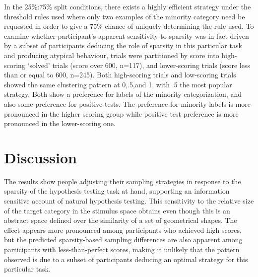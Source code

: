 \documentclass[10pt,letterpaper]{article}
\begin{document}
In the 25\%:75\% split conditions, there exists a highly efficient strategy under the threshold rules used where only two examples of the minority category need be requested in order to give a 75\% chance of uniquely determining the rule used. To examine whether participant's apparent sensitivity to sparsity was in fact driven by a subset of participants deducing the role of sparsity in this particular task and producing atypical behaviour, trials were partitioned by score into high-scoring `solved' trials (score over 600, n=117), and lower-scoring trials (score less than or equal to 600, n=245). Both high-scoring trials and low-scoring trials showed the same clustering pattern at 0,.5,and 1, with .5 the most popular strategy. Both show a preference for labels of the minority categorization, and also some preference for positive tests. The preference for minority labels is more pronounced in the higher scoring group while positive test preference is more pronounced in the lower-scoring one.%


\section{Discussion}
The results show people adjusting their sampling strategies in response to the sparsity of the hypothesis testing task at hand, supporting an information sensitive account of natural hypothesis testing\cite{navarro2011sparsecat}. This sensitivity to the relative size of the target category in the stimulus space obtains even though this is an abstract space defined over the similarity of a set of geometrical shapes. The effect appears more pronounced among participants who achieved high scores, but the predicted sparsity-based sampling differences are also apparent among participants with less-than-perfect scores, making it unlikely that the pattern observed is due to a subset of participants deducing an optimal strategy for this particular task. %
\end{document}
